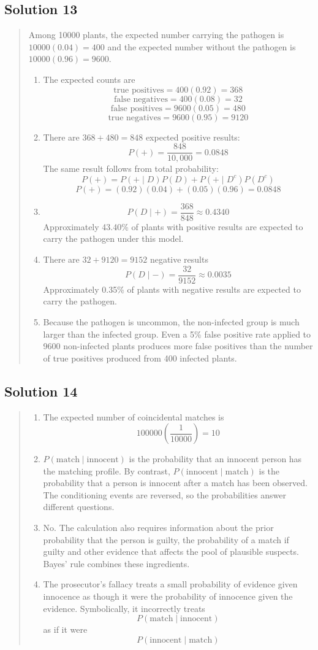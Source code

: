\documentclass[10pt,letterpaper]{article}
\newcommand{\solutionheading}[1]{%
  \subsection*{Solution #1}
}
\newenvironment{answer}{%
  \begin{quote}\small\color{black}
}{%
  \end{quote}
}
\begin{document}
\solutionheading{13}
\begin{answer}
Among 10000 plants, the expected number carrying the pathogen is $10000(0.04)=400$ and the expected number without the pathogen is $10000(0.96)=9600$.
\begin{enumerate}
	\item The expected counts are
	$$\text{true positives}=400(0.92)=368$$
	$$\text{false negatives}=400(0.08)=32$$
	$$\text{false positives}=9600(0.05)=480$$
	$$\text{true negatives}=9600(0.95)=9120$$
	\item There are $368+480=848$ expected positive results:
	$$P(+)=\frac{848}{10{,}000}=0.0848$$
  	The same result follows from total probability:
	$$P(+)=P(+\mid D)P(D)+P(+\mid D^c)P(D^c)$$
	$$P(+)=(0.92)(0.04)+(0.05)(0.96)=0.0848$$
	\item
	$$P(D\mid+)=\frac{368}{848}\approx0.4340$$
  	Approximately 43.40\% of plants with positive results are expected to carry the pathogen under this model.
  	\item There are $32+9120=9152$ negative results
	$$P(D\mid-)=\frac{32}{9152}\approx0.0035$$
 	 Approximately 0.35\% of plants with negative results are expected to carry the pathogen.
  	\item Because the pathogen is uncommon, the non-infected group is much larger than the infected group. Even a 5\% false positive rate applied to 9600 non-infected plants produces more false positives than the number of true positives produced from 400 infected plants.
\end{enumerate}
\end{answer}

\solutionheading{14}
\begin{answer}
\begin{enumerate}
	\item The expected number of coincidental matches is
	$$100000\left(\frac{1}{10000}\right)=10$$
	\item $P(\text{match}\mid\text{innocent})$ is the probability that an innocent person has the matching profile. By contrast, $P(\text{innocent}\mid\text{match})$ is the probability that a person is innocent after a match has been observed. The conditioning events are reversed, so the probabilities answer different questions.
	\item No. The calculation also requires information about the prior probability that the person is guilty, the probability of a match if guilty and other evidence that affects the pool of plausible suspects. Bayes' rule combines these ingredients.
	\item The prosecutor's fallacy treats a small probability of evidence given innocence as though it were the probability of innocence given the evidence. Symbolically, it incorrectly treats
$$P(\text{match}\mid\text{innocent})$$
as if it were
$$P(\text{innocent}\mid\text{match})$$
\end{enumerate}
\end{answer}
\end{document}
